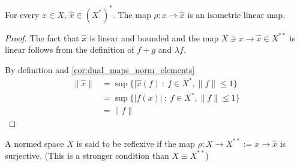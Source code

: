 \begin{theorem}
  For every $x \in X$, $\hat{ x } \in (X^{*})^{*}$. The map $\rho: x
  \to \hat{x}$ is an isometric linear map.
\end{theorem}
\begin{proof}
  The fact that $ \hat{x}$ is linear and bounded and the map $X \ni x
  \to \hat{x} \in X^{**}$ is linear follows from the definition of
  $f+g$ and $\lambda f$.

  By definition and   \autoref{cor:dual_maps_norm_elements}
  \begin{align*}
    \|\hat{x}\| &= \sup \{ |\hat{x}(f) \ : \ f \in X^{*}, \|f\| \le 1 \} \\
    & = \sup \{ |f(x)| \ : \ f \in X^{*}, \|f\| \le 1 \} \\
    & = \|f\|
  \end{align*}
\end{proof}

\begin{definition}
  A normed space $X$ is said to be reflexive if the map $\rho: X \to
  X^{**}:= x \to \hat{x}$ is surjective. (This is a stronger
  condition than $X \equiv X^{**}$)
\end{definition}


